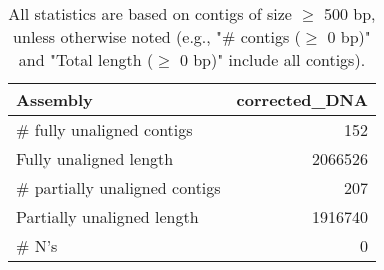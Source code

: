 \documentclass[12pt,a4paper]{article}
\begin{document}
\begin{table}[ht]
\begin{center}
\caption{All statistics are based on contigs of size $\geq$ 500 bp, unless otherwise noted (e.g., "\# contigs ($\geq$ 0 bp)" and "Total length ($\geq$ 0 bp)" include all contigs).}
\begin{tabular}{|l*{1}{|r}|}
\hline
Assembly & corrected\_DNA \\ \hline
\# fully unaligned contigs & 152 \\ \hline
Fully unaligned length & 2066526 \\ \hline
\# partially unaligned contigs & 207 \\ \hline
Partially unaligned length & 1916740 \\ \hline
\# N's & 0 \\ \hline
\end{tabular}
\end{center}
\end{table}
\end{document}
